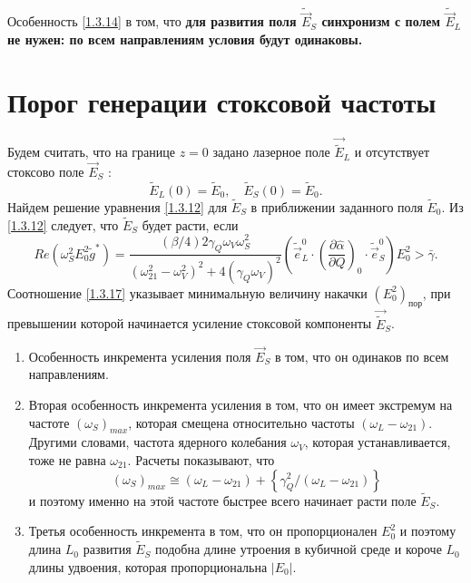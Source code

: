 \documentclass[a4paper]{article}
\begin{document}
Особенность \eqref{1.3.14} в том, что \textbf{для развития поля $\tilde{\vec{E}}_{S}$ синхронизм с полем $\tilde{\vec{E}}_{L}$ не нужен: по всем направлениям условия будут одинаковы.}
\section{Порог генерации стоксовой частоты}

Будем считать, что на границе $z=0$ задано лазерное поле $\vec{\tilde{E}}_{L}$ и отсутствует стоксово поле $\vec{E}_{S}$ : 
\begin{equation}
	\tilde{E}_{L}(0)=\tilde{E}_{0},\quad\tilde{E}_{S}(0)=\tilde{E}_{0}.\label{1.3.16}
\end{equation}
Найдем решение уравнения \eqref{1.3.12} для $\tilde{E}_{S}$ в приближении заданного поля $\tilde{E}_{0}$. Из \eqref{1.3.12} следует, что $\tilde{E}_{S}$ будет расти, если
\begin{equation}
	Re(\omega_{S}^{2}E_{0}^{2}\tilde{g}^{*})=\frac{(\beta/4)2\gamma_{Q}\omega_{V}\omega_{S}^{2}}{(\omega_{21}^{2}-\omega_{V}^{2})^{2}+4(\gamma_{Q}\omega_{V})^{2}}\left(\tilde{\vec{e}}_{L}^{0}\cdot\left(\frac{\partial\hat{\alpha}}{\partial Q}\right)_{0}\cdot\tilde{\vec{e}}_{S}^{0}\right)E_{0}^{2}>\bar{\gamma}.
	\label{1.3.17}
\end{equation}
Соотношение \eqref{1.3.17} указывает минимальную величину накачки $(E_{0}^{2})_{\text{пор}}$, при превышении которой начинается усиление стоксовой компоненты $\vec{\tilde{E}}_{S}$.
\begin{enumerate}
	\item Особенность инкремента усиления поля $\vec{E}_{S}$ в том, что он одинаков по всем направлениям. 
	\item Вторая особенность инкремента усиления в том, что он имеет экстремум на частоте $(\omega_{S})_{max}$, которая смещена относительно частоты $(\omega_{L}-\omega_{21})$. Другими словами, частота ядерного колебания $\omega_{V}$, которая устанавливается, тоже не равна $\omega_{21}$. Расчеты показывают, что
	\begin{equation}
		(\omega_{S})_{max}\cong(\omega_{L}-\omega_{21})+\left\{\gamma_{Q}^{2}/(\omega_{L}-\omega_{21})\right\}
		\label{1.3.18}
	\end{equation}
	и поэтому именно на этой частоте быстрее всего начинает расти поле $\tilde{E}_{S}$.
	\item  Третья особенность инкремента в том, что он пропорционален $E_{0}^{2}$ и поэтому длина $L_{0}$ развития $\tilde{E}_{S}$ подобна длине утроения в кубичной среде и короче $L_{0}$ длины удвоения, которая пропорциональна $\left|E_{0}\right|$. 
\end{enumerate}
\end{document}

